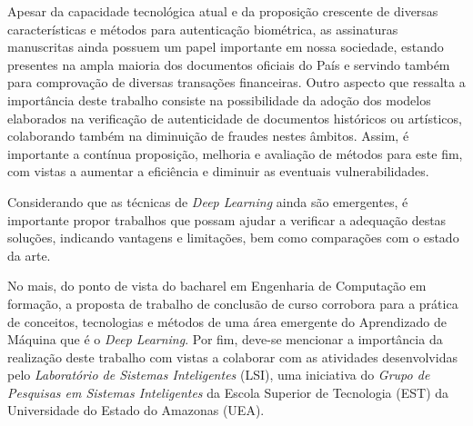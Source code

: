 
Apesar da capacidade tecnológica atual e da proposição crescente de diversas características e métodos para autenticação biométrica, as assinaturas manuscritas ainda possuem um papel importante em nossa sociedade, estando presentes na ampla maioria dos documentos oficiais do País e servindo também para comprovação de diversas transações financeiras. Outro aspecto que ressalta a importância deste trabalho consiste na possibilidade da adoção dos modelos elaborados na verificação de autenticidade de documentos históricos ou artísticos, colaborando também na diminuição de fraudes nestes âmbitos. Assim, é importante a contínua proposição, melhoria e avaliação de métodos para este fim, com vistas a aumentar a eficiência e diminuir as eventuais vulnerabilidades.

Considerando que as técnicas de \emph{Deep Learning} ainda são emergentes, é importante propor trabalhos que possam ajudar a verificar a adequação destas soluções, indicando vantagens e limitações, bem como comparações com o estado da arte.

No mais, do ponto de vista do bacharel em Engenharia de Computação em formação, a proposta de trabalho de conclusão de curso corrobora para a prática de conceitos, tecnologias e métodos de uma área emergente do Aprendizado de Máquina que é o \emph{Deep Learning}. Por fim, deve-se mencionar a importância da realização deste trabalho com vistas a colaborar com as atividades desenvolvidas pelo \emph{Laboratório de Sistemas Inteligentes} (LSI), uma iniciativa do \emph{Grupo de Pesquisas em Sistemas Inteligentes} da Escola Superior de Tecnologia (EST) da Universidade do Estado do Amazonas (UEA).
